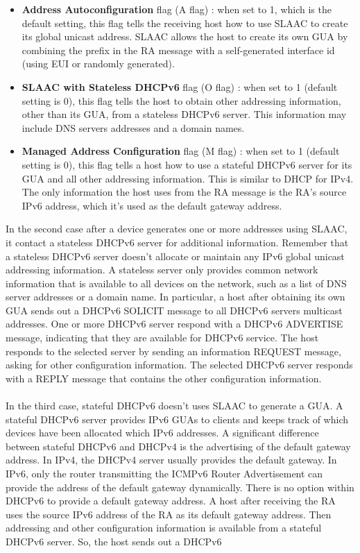 \documentclass[11pt]{article}
\begin{document}
\begin{itemize}
\item \textbf{Address Autoconfiguration} flag (A flag) : when set to 1, which is the default setting, this flag tells the receiving host how to use SLAAC to create its global unicast address. SLAAC allows the host to create its own GUA by combining the prefix in the RA message with a self-generated interface id (using EUI or randomly generated).
\item \textbf{SLAAC with Stateless DHCPv6} flag (O flag) : when set to 1 (default setting is 0), this flag tells the host to obtain other addressing information, other than its GUA, from a stateless DHCPv6 server. This information may include DNS servers addresses and a domain names. 
\item \textbf{Managed Address Configuration} flag (M flag) : when set to 1 (default setting is 0), this flag tells a host how to use a stateful DHCPv6 server for its GUA and all other addressing information. This is similar to DHCP for IPv4. The only information the host uses from the RA message is the RA's source IPv6 address, which it's used as the default gateway address.
\end{itemize}
In the second case after a device generates one or more addresses using SLAAC, it contact a stateless DHCPv6 server for additional information. Remember that a stateless DHCPv6 server doesn't allocate or maintain any IPv6 global unicast addressing information. A stateless server only provides common network information that is available to all devices on the network, such as a list of DNS server addresses or a domain name. In particular, a host after obtaining its own GUA sends out a DHCPv6 SOLICIT message to all DHCPv6 servers multicast addresses. One or more DHCPv6 server respond with a DHCPv6 ADVERTISE message, indicating that they are available for DHCPv6 service. The host responds to the selected server by sending an information REQUEST message, asking for other configuration  information. The selected DHCPv6 server responds with a REPLY message that contains the other configuration information.\\\\In the third case, stateful DHCPv6 doesn't uses SLAAC to generate a GUA. A stateful DHCPv6 server provides IPv6 GUAs to clients and keeps track of which devices have been allocated which IPv6 addresses. A significant difference between stateful DHCPv6 and DHCPv4 is the advertising of the default gateway address. In IPv4, the DHCPv4 server usually provides the default gateway. In IPv6, only the router transmitting the ICMPv6 Router Advertisement can provide the address of the default gateway dynamically. There is no option within DHCPv6 to provide a default gateway address. A host after receiving the RA uses the source IPv6 address of the RA as its default gateway address. Then addressing and other configuration information is available from a stateful DHCPv6 server. So, the host sends out a DHCPv6
\end{document}
